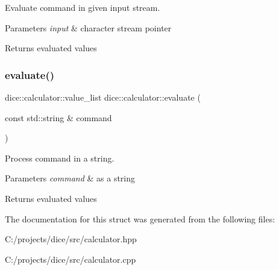 Evaluate command in given input stream. 


\begin{DoxyParams}{Parameters}
{\em input} & character stream pointer\\
\hline
\end{DoxyParams}
\begin{DoxyReturn}{Returns}
evaluated values 
\end{DoxyReturn}
\mbox{\label{structdice_1_1calculator_ad1b34884dbf00d5e1e140195e9a50ecc}} 
\subsubsection{\texorpdfstring{evaluate()}{evaluate()}\hspace{0.1cm}{\footnotesize\ttfamily [2/2]}}
{\footnotesize\ttfamily dice\+::calculator\+::value\+\_\+list dice\+::calculator\+::evaluate (\begin{DoxyParamCaption}\item[{const std\+::string \&}]{command }\end{DoxyParamCaption})}



Process command in a string. 


\begin{DoxyParams}{Parameters}
{\em command} & as a string\\
\hline
\end{DoxyParams}
\begin{DoxyReturn}{Returns}
evaluated values 
\end{DoxyReturn}


The documentation for this struct was generated from the following files\+:\begin{DoxyCompactItemize}
\item 
C\+:/projects/dice/src/calculator.\+hpp\item 
C\+:/projects/dice/src/calculator.\+cpp\end{DoxyCompactItemize}

